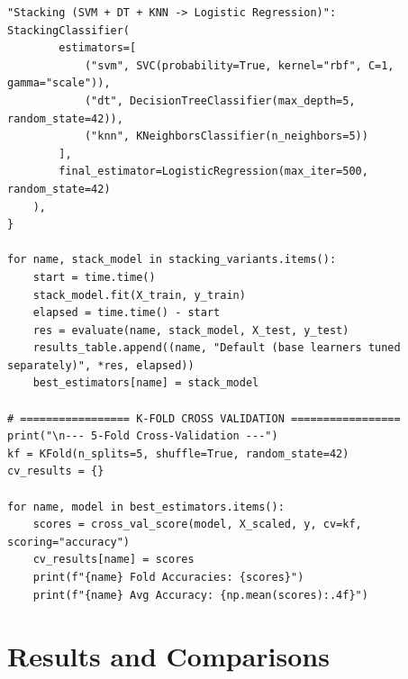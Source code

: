 \documentclass[12pt,a4paper]{article}
\begin{document}
\begin{lstlisting}[style=python]
    "Stacking (SVM + DT + KNN -> Logistic Regression)": StackingClassifier(
        estimators=[
            ("svm", SVC(probability=True, kernel="rbf", C=1, gamma="scale")),
            ("dt", DecisionTreeClassifier(max_depth=5, random_state=42)),
            ("knn", KNeighborsClassifier(n_neighbors=5))
        ],
        final_estimator=LogisticRegression(max_iter=500, random_state=42)
    ),
}

for name, stack_model in stacking_variants.items():
    start = time.time()
    stack_model.fit(X_train, y_train)
    elapsed = time.time() - start
    res = evaluate(name, stack_model, X_test, y_test)
    results_table.append((name, "Default (base learners tuned separately)", *res, elapsed))
    best_estimators[name] = stack_model

# ================= K-FOLD CROSS VALIDATION =================
print("\n--- 5-Fold Cross-Validation ---")
kf = KFold(n_splits=5, shuffle=True, random_state=42)
cv_results = {}

for name, model in best_estimators.items():
    scores = cross_val_score(model, X_scaled, y, cv=kf, scoring="accuracy")
    cv_results[name] = scores
    print(f"{name} Fold Accuracies: {scores}")
    print(f"{name} Avg Accuracy: {np.mean(scores):.4f}")
\end{lstlisting}

\section*{Results and Comparisons}
\end{document}
